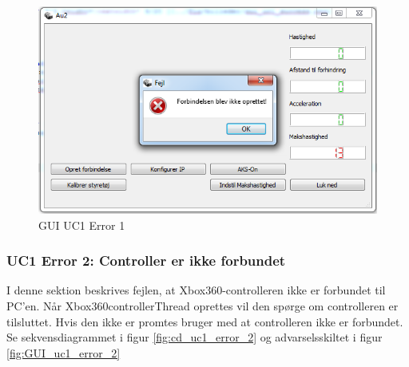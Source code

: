 \begin{figure}[H]
\centering
\includegraphics[width=\textwidth* 3/4,height=\textwidth* 9/20 ]{../fig/billeder/gui_uc1_error_1.png}
\caption{GUI UC1 Error 1}
\label{fig:GUI_uc1_error_1}
\end{figure}

\subsubsection{UC1 Error 2: Controller er ikke forbundet}
I denne sektion beskrives fejlen, at Xbox360-controlleren ikke er forbundet til PC'en. Når Xbox360controllerThread oprettes vil den spørge om controlleren er tilsluttet. Hvis den ikke er promtes bruger med at controlleren ikke er forbundet. Se sekvensdiagrammet i figur \ref{fig:cd_uc1_error_2} og advarselsskiltet i figur \ref{fig:GUI_uc1_error_2}

